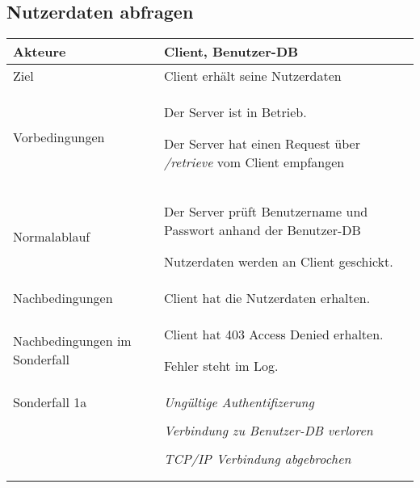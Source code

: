 \documentclass[a4paper,10pt,titlepage]{article}
\makeatletter
\newcommand\novspace{\@minipagetrue}
\newenvironment{owncompactitem}{%
\compactitem
}{%
\@finalstrut\@arstrutbox
\@nameuse{endcompactitem}%
\aftergroup\let\aftergroup\@finalstrut\aftergroup\@gobble
}
\newenvironment{owncompactenum}{%
\compactenum
}{%
\@finalstrut\@arstrutbox
\@nameuse{endcompactenum}%
\aftergroup\let\aftergroup\@finalstrut\aftergroup\@gobble
}
\newcommand{\usecase}[7]
{\subsection{#1}
\setlength{\extrarowheight}{2pt}
\begin{tabular}{|p{0.2\textwidth}|p{0.9\textwidth}|}
\hline
  Akteure & #2\\\hline
  Ziel & #3\\\hline
  Vorbedingungen & \novspace
  	\begin{owncompactitem}[-] #4 \end{owncompactitem} \\\hline
  Normalablauf & \vspace{-7pt}
  	\begin{owncompactenum}[1.] #6 \end{owncompactenum} \\\hline
  Nachbedingungen & \novspace
  	\begin{owncompactitem}[-] #5 \end{owncompactitem} \\\hline
  #7
\end{tabular}
}
\newcommand{\sonderfall}[4][\empty]
{
Sonderfall #2 & \vspace{-10pt}
	\textit{#3}
	\begin{owncompactenum}[{#2}.1] {#4} \end{owncompactenum}
  	\ifthenelse{\equal{#1}{\empty}}
    	{\\\hline} %
    	{\ensuremath{\rightarrow} #1 \\ [+1pt] \hline} %

}
\newcommand{\sondernachbedingung}[1]
{
Nachbedingungen im Sonderfall& \novspace
	\begin{owncompactitem}[-]
		#1
	\end{owncompactitem} \\\hline
}
\makeatother
\begin{document}
\usecase{Nutzerdaten abfragen}{Client, Benutzer-DB}%
{Client erhält seine Nutzerdaten}%
{%
  \item Der Server ist in Betrieb.
  \item Der Server hat einen Request über \textit{/retrieve} vom Client empfangen
}
{%
  \item Client hat die Nutzerdaten erhalten.
}
{%
  \item Der Server prüft Benutzername und Passwort anhand der Benutzer-DB
  \item Nutzerdaten werden an Client geschickt.
}
{%
  \sondernachbedingung{
	\item Client hat 403 Access Denied erhalten.
	\item Fehler steht im Log.
	}
	
	\sonderfall[Weiter mit normalem Betrieb]{1a}
    {Ungültige Authentifizerung}
    {
    \item Fehler wird ins Log geschrieben
  	\item Der Client erhält eine entsprechende Fehlermeldung mit HTTP-Status 403 Access Denied
    }

	 \sonderfall[Kritischer Fehler, Server ist beendet]{*}%
	{Verbindung zu Benutzer-DB verloren}%
  	{
	\item Der Fehler wird ins Log geschrieben (als schwerwiegender Fehler)
	\item Der Client erhält eine entsprechende Fehlermeldung
	\item Der Server wird beendet
  	}

\sonderfall[Weiter mit normalem Betrieb]{**}%
	{TCP/IP Verbindung abgebrochen}%
	{
	\item Fehlermeldung wird ins Log geschrieben
	}
}
\end{document}
